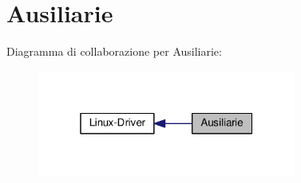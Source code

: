 \hypertarget{group__ausiliarie}{\section{Ausiliarie}
\label{group__ausiliarie}
}
Diagramma di collaborazione per Ausiliarie\+:\nopagebreak
\begin{figure}[H]
\begin{center}
\leavevmode
\includegraphics[width=241pt]{group__ausiliarie}
\end{center}
\end{figure}
